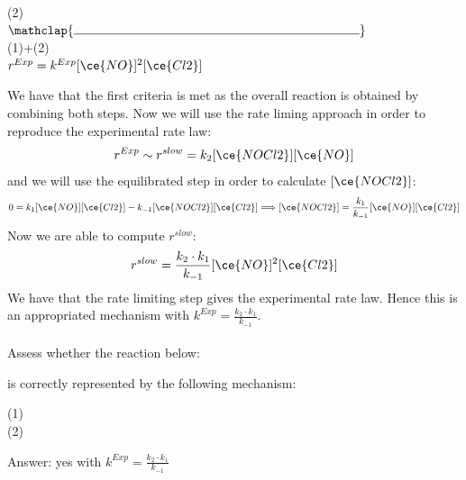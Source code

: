 \documentclass[main.tex]{subfiles}
\begin{document}
\begin{description}
\begin{example}
\begin{center}
(2)\hfill{} 
\\$\mathclap{\rule{8cm}{0.4pt}}$\\
(1)+(2)\hfill{}\\{ \hfill $r^{Exp}=k^{Exp} [\ce{NO}]^2[\ce{Cl2}] $} 
\end{center}
We have that the first criteria is met as the overall reaction is obtained by combining both steps. Now we will use the rate liming approach in order to reproduce the experimental rate law:
\[r^{Exp}\sim r^{slow}=k_2[\ce{NOCl2}][\ce{NO}]\]
and we will use the equilibrated step in order to calculate $[\ce{NOCl2}]$:
\[0=k_1[\ce{NO}][\ce{Cl2}]-k_{-1}[\ce{NOCl2}][\ce{Cl2}] \Longrightarrow [\ce{NOCl2}]=\frac{k_1}{k_{-1}}[\ce{NO}][\ce{Cl2}]\]
Now we are able to compute $r^{slow}$:
\[r^{slow}=	\frac{k_2\cdot k_1}{k_{-1}}[\ce{NO}]^2[\ce{Cl2}] 	\]
We have that the rate limiting step gives the experimental rate law. Hence this is an appropriated mechanism with $k^{Exp}=\frac{k_2\cdot k_1}{k_{-1}}$.\\
\faDiamond\ \\
Assess whether the reaction below:
\begin{center} \end{center}
is correctly represented by the following mechanism:
\begin{center}
(1)\hfill{} \\
(2)\hfill{} 
\end{center}
\flushright Answer:   yes with $k^{Exp}=\frac{k_2\cdot k_1}{k_{-1}}$
\end{example}%






\end{description}
\end{document}
